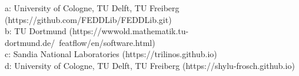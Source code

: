 a: University of Cologne, TU Delft, TU Freiberg (https://github.com/FEDDLib/FEDDLib.git)\\
b: TU Dortmund (https://wwwold.mathematik.tu-dortmund.de/~featflow/en/software.html)\\
c: Sandia National Laboratories (https://trilinos.github.io)\\
d: University of Cologne, TU Delft, TU Freiberg (https://shylu-frosch.github.io)\\
